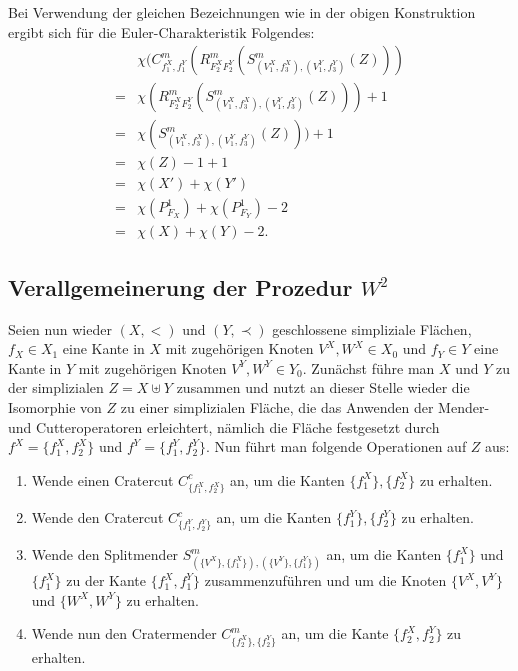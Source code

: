 \documentclass[12pt,titlepage,twoside,cleardoublepage]{article}
\theoremstyle{nummermitklammern}
\numberwithin{equation}{section}
\begin{document}
Bei Verwendung der gleichen Bezeichnungen wie in der obigen Konstruktion ergibt sich für die Euler-Charakteristik Folgendes:
\begin{align*}
&\chi(C^m_{f_1^X,f_1^Y}(R^m_{F_2^X F_2^Y}(S^m_{(V_1^X,f_3^X),(V_1^Y,f_3^Y)}(Z)))\\
=&\chi(R^m_{F_2^X F_2^Y}(S^m_{(V_1^X,f_3^X),(V_1^Y,f_3^Y)}(Z)))+1\\
=&\chi(S^m_{(V_1^X,f_3^X),(V_1^Y,f_3^Y)}(Z)))+1\\
=&\chi(Z)-1+1\\
=&\chi(X')+\chi(Y')\\
=&\chi(P^1_{F_X})+\chi(P^1_{F_Y})-2\\
=&\chi(X)+ \chi(Y)-2.
\end{align*}

  \subsection{Verallgemeinerung der Prozedur $W^2$}
Seien nun wieder $(X,<)$ und $(Y,\prec)$ geschlossene simpliziale Flächen, $f_X\in X_1$ eine Kante in $X$ mit zugehörigen Knoten $V^X,W^X \in X_0$ und $f_Y\in Y$ eine Kante in $Y$ mit zugehörigen Knoten $V^Y,W^Y\in Y_0$. Zunächst führe man $X$ und $Y$ zu der simplizialen $Z=X \uplus Y$ zusammen und nutzt an dieser Stelle wieder die Isomorphie von $Z$ zu einer simplizialen Fläche, die das Anwenden der Mender- und Cutteroperatoren erleichtert, nämlich die Fläche festgesetzt durch $f^X=\{f_1^X,f^X_2\}$ und $f^Y=\{f_1^Y,f^Y_2\}$. Nun führt man folgende Operationen auf $Z$ aus:
\begin{enumerate}
 \item Wende einen Cratercut $C^c_{\{f_1^X,f_2^X\}}$ an, um die Kanten $\{f_1^X\},\{f_2^X\}$ zu erhalten.
 \item Wende den Cratercut $C^c_{\{f_1^Y,f_2^Y\}}$ an, um die Kanten $\{f_1^Y\},\{{f_2^Y}\}$ zu erhalten.
\item Wende den Splitmender $S^m_{(\{V^X\},\{f_1^X\}),(\{V^Y\},\{f_1^Y\})}$ an, um die Kanten $\{f_1^X\}$ und $\{{f_1^X}\}$ zu der Kante $\{f_1^X,f_1^Y\}$ zusammenzuführen und um die Knoten $\{V^X,V^Y\}$ und $\{W^X,W^Y\}$ zu erhalten.
 \item Wende nun den Cratermender $C^m_{\{f_2^X\},\{{f_2^Y}\}}$ an, um die Kante $\{f_2^X,f_2^Y\}$ zu erhalten.
 \end{enumerate}
 
\end{document}
